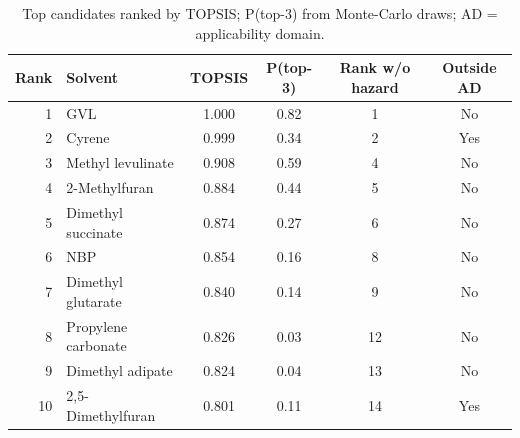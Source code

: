 \begin{table}[ht]
\centering
\caption{Top candidates ranked by TOPSIS; P(top-3) from Monte-Carlo draws; AD = applicability domain.}
\label{tab:ranking}
\begin{tabular}{rlcccc}
\toprule
Rank & Solvent & TOPSIS & P(top-3) & Rank w/o hazard & Outside AD \\
\midrule
1 & GVL & 1.000 & 0.82 & 1 & No \\
2 & Cyrene & 0.999 & 0.34 & 2 & Yes \\
3 & Methyl levulinate & 0.908 & 0.59 & 4 & No \\
4 & 2-Methylfuran & 0.884 & 0.44 & 5 & No \\
5 & Dimethyl succinate & 0.874 & 0.27 & 6 & No \\
6 & NBP & 0.854 & 0.16 & 8 & No \\
7 & Dimethyl glutarate & 0.840 & 0.14 & 9 & No \\
8 & Propylene carbonate & 0.826 & 0.03 & 12 & No \\
9 & Dimethyl adipate & 0.824 & 0.04 & 13 & No \\
10 & 2,5-Dimethylfuran & 0.801 & 0.11 & 14 & Yes \\
\bottomrule
\end{tabular}
\end{table}
